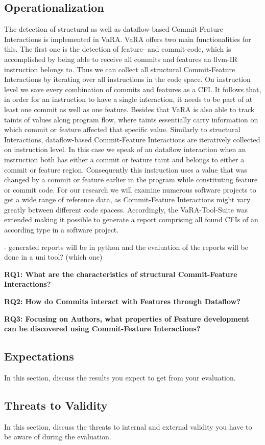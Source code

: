 \subsection*{Operationalization}\label{sec:operationalization}

The detection of structural as well as dataflow-based Commit-Feature Interactions is implemented in VaRA.
VaRA offers two main functionalities for this. 
The first one is the detection of feature- and commit-code, which is accomplished by being able to receive all commits and features an llvm-IR instruction belongs to.
Thus we can collect all structural Commit-Feature Interactions by iterating over all instructions in the code space.
On instruction level we save every combination of commits and features as a CFI.
It follows that, in order for an instruction to have a single interaction, it needs to be part of at least one commit as well as one feature.
Besides that VaRA is also able to track taints of values along program flow, where taints essentially carry information on which commit or feature affected that specific value.
Similarly to structural Interactions, dataflow-based Commit-Feature Interactions are iteratively collected on instruction level.
In this case we speak of an dataflow interaction when an instruction both has either a commit or feature taint and belongs to either a commit or feature region.
Consequently this instruction uses a value that was changed by a commit or feature earlier in the program while constituting feature or commit code.
For our research we will examine numerous software projects to get a wide range of reference data, as Commit-Feature Interactions might vary greatly between different code spacess.
Accordingly, the VaRA-Tool-Suite was extended making it possible to generate a report comprising all found CFIs of an according type in a software project.

- generated reports will be in python and the evaluation of the reports will be done in a uni tool? (which one)

\textbf{RQ1: What are the characteristics of structural Commit-Feature Interactions?}

\textbf{RQ2: How do Commits interact with Features through Dataflow?}

\textbf{RQ3: Focusing on Authors, what properties of Feature development can be discovered using Commit-Feature Interactions?}

\subsection*{Expectations}\label{sec:expectations}

In this section, discuss the results you expect to get from your evaluation.

\subsection*{Threats to Validity}\label{sec:threats}

In this section, discuss the threats to internal and external validity you have to be aware of during the evaluation.
